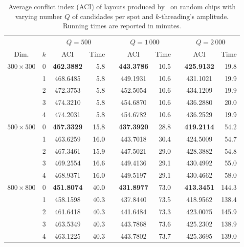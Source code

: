 \begin{table}[t]\centering
\caption{\label{tab:greedyplus_aci}
  Average conflict index (ACI) of layouts produced by \Greedyplus\ on random
  chips with varying number $Q$ of candidades per spot and $k$-threading's
  amplitude. Running times are reported in minutes.}
\footnotesize{
\begin{tabular}{crcrlcrlcr}
\vspace{1pt}
     &     & \multicolumn{2}{c}{$Q=500$} & & \multicolumn{2}{c}{$Q=1\,000$} & & \multicolumn{2}{c}{$Q=2\,000$} \\ \cline{3-4} \cline{6-7} \cline{9-10}
\vspace{1pt}
Dim. & $k$ & ACI & Time & & ACI & Time & & ACI & Time \\
\hline
$300\times 300$ &  0 & {\bf 462.3882} &  5.8 &  & {\bf 443.3786} & 10.5 &  & {\bf 425.9132} &  19.8 \\
                &  1 &      468.6485  &  5.8 &  &      449.1931  & 10.6 &  &      431.1021  &  19.9 \\
                &  2 &      472.3753  &  5.8 &  &      452.5054  & 10.6 &  &      434.1209  &  19.9 \\
                &  3 &      474.3210  &  5.8 &  &      454.6870  & 10.6 &  &      436.2880  &  20.0 \\
                &  4 &      474.2031  &  5.8 &  &      454.6782  & 10.6 &  &      436.2529  &  19.9 \\
\hline
$500\times 500$ &  0 & {\bf 457.3329} & 15.8 &  & {\bf 437.3920} & 28.8 &  & {\bf 419.2114} &  54.2 \\
                &  1 &      463.6259  & 16.0 &  &      443.7018  & 30.4 &  &      424.5009  &  54.7 \\
                &  2 &      467.3461  & 15.9 &  &      447.5021  & 29.0 &  &      428.3882  &  54.8 \\
                &  3 &      469.2554  & 16.6 &  &      449.4136  & 29.1 &  &      430.4992  &  55.0 \\
                &  4 &      468.9371  & 16.0 &  &      449.5197  & 29.1 &  &      430.4662  &  58.0 \\
\hline
$800\times 800$ &  0 & {\bf 451.8074} & 40.0 &  & {\bf 431.8977} & 73.0 &  & {\bf 413.3451} & 144.3 \\
                &  1 &      458.1598  & 40.3 &  &      437.8440  & 73.5 &  &      418.9562  & 138.4 \\
                &  2 &      461.6418  & 40.3 &  &      441.6484  & 73.3 &  &      423.0075  & 145.9 \\
                &  3 &      463.5349  & 40.3 &  &      443.7868  & 73.6 &  &      425.2302  & 138.9 \\
                &  4 &      463.1225  & 40.3 &  &      443.7802  & 73.7 &  &      425.3695  & 139.0 \\
\hline
\end{tabular}}
\end{table}

